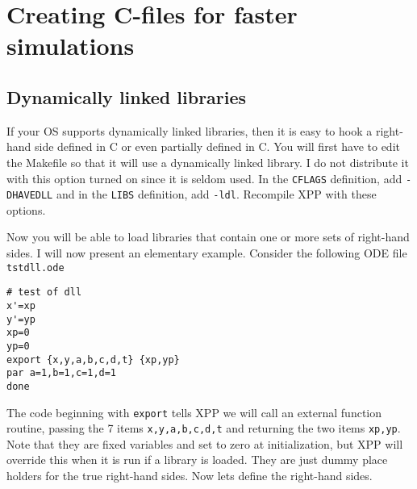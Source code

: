 \documentclass{article}
\begin{document}
\section{Creating C-files for faster simulations}
\subsection{Dynamically linked libraries}
If your OS supports dynamically linked libraries, then it is easy to
hook a right-hand side defined in C or even partially defined in
C. You will first have to edit the Makefile so that it will use  a
dynamically linked library. I do not distribute it with this option
turned on since it is seldom used.  In the {\tt CFLAGS} definition,
add {\tt -DHAVEDLL} and in the {\tt LIBS} definition, add {\tt -ldl}.
Recompile XPP with these options.


Now you will be able to load libraries that contain one or more sets
of right-hand sides.  I will now present an
elementary example. Consider the following ODE file {\tt tstdll.ode}
\begin{verbatim}
# test of dll
x'=xp
y'=yp
xp=0
yp=0
export {x,y,a,b,c,d,t} {xp,yp}
par a=1,b=1,c=1,d=1
done

\end{verbatim}
The code beginning with {\tt export} tells XPP we will call an
external function routine, passing the 7 items {\tt x,y,a,b,c,d,t} and
returning the two items {\tt xp,yp}.  Note that they are fixed
variables and set to zero at initialization, but XPP will override
this when it is run if a library is loaded.
  They are just dummy place holders for the true
right-hand sides.  Now lets define the right-hand sides.
\end{document}
